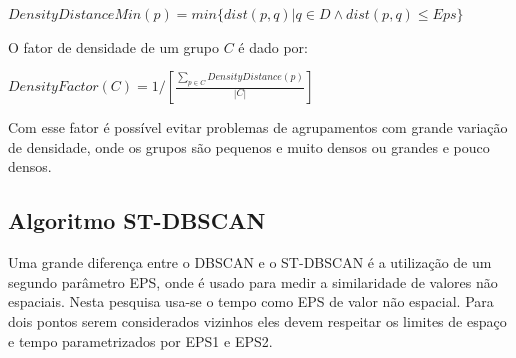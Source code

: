 ${DensityDistanceMin(p) = min\big\{ dist(p, q) | q \in D \wedge dist(p, q)  \leqslant Eps\big\} }$
\linebreak

O fator de densidade de um grupo ${C}$ é dado por:

${DensityFactor(C) = 1\big/\left [   \frac{\sum_{p\in C}DensityDistance(p)}{|C|} \right ]
}$
\linebreak

Com esse fator é possível evitar problemas de agrupamentos com grande variação de densidade, onde os grupos são pequenos e muito densos ou grandes e pouco densos.

\subsection{Algoritmo ST-DBSCAN}
Uma grande diferença entre o DBSCAN e o ST-DBSCAN é a utilização de um segundo parâmetro EPS, onde é usado para medir a similaridade de valores não espaciais. Nesta pesquisa usa-se o tempo como EPS de valor não espacial. Para dois pontos serem considerados vizinhos eles devem respeitar os limites de espaço e tempo parametrizados por EPS1 e EPS2.

